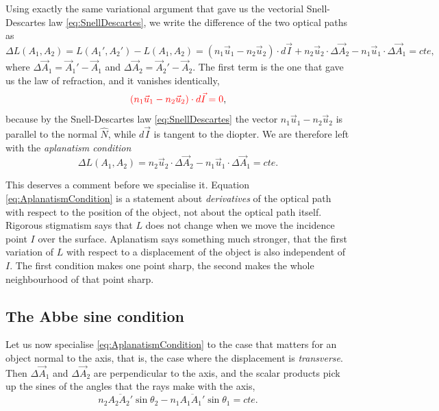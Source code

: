                 Using exactly the same variational argument that gave us the vectorial Snell-Descartes law \ref{eq:SnellDescartes}, we write the difference of the two optical paths as
                \begin{equation}\label{eq:AplanatismVariation}
                    \Delta L\left(A_1,A_2\right) = L\left(A_1',A_2'\right) - L\left(A_1,A_2\right) = \left( n_1\vec{u}_1 - n_2\vec{u}_2 \right)\cdot d\vec{I} + n_2\vec{u}_2\cdot\Delta\vec{A}_2 - n_1\vec{u}_1\cdot\Delta\vec{A}_1 = cte,
                \end{equation}
                where $\Delta\vec{A}_1 = \vec{A}_1'-\vec{A}_1$ and $\Delta\vec{A}_2 = \vec{A}_2'-\vec{A}_2$. The first term is the one that gave us the law of refraction, and it vanishes identically,
                \begin{equation*}
                    {\color{red}\left( n_1\vec{u}_1 - n_2\vec{u}_2 \right)\cdot d\vec{I} = 0},
                \end{equation*}
                because by the Snell-Descartes law \ref{eq:SnellDescartes} the vector $n_1\vec{u}_1-n_2\vec{u}_2$ is parallel to the normal $\hat{N}$, while $d\vec{I}$ is tangent to the diopter. We are therefore left with the \emph{aplanatism condition}
                \begin{equation}\label{eq:AplanatismCondition}
                    \Delta L\left( A_1,A_2 \right) = n_2\vec{u}_2\cdot\Delta\vec{A}_2 - n_1\vec{u}_1\cdot\Delta\vec{A}_1 = cte.
                \end{equation}

                This deserves a comment before we specialise it. Equation \ref{eq:AplanatismCondition} is a statement about \textit{derivatives} of the optical path with respect to the position of the object, not about the optical path itself. Rigorous stigmatism says that $L$ does not change when we move the incidence point $I$ over the surface. Aplanatism says something much stronger, that the first variation of $L$ with respect to a displacement of the object is also independent of $I$. The first condition makes one point sharp, the second makes the whole neighbourhood of that point sharp.

            \subsection{The Abbe sine condition}\label{subsec:AbbeSine}

                Let us now specialise \ref{eq:AplanatismCondition} to the case that matters for an object normal to the axis, that is, the case where the displacement is \textit{transverse}. Then $\Delta\vec{A}_1$ and $\Delta\vec{A}_2$ are perpendicular to the axis, and the scalar products pick up the sines of the angles that the rays make with the axis,
                \begin{equation}\label{eq:AbbeTransverse}
                    n_2\overline{A_2A_2'}\sin\theta_2 - n_1\overline{A_1A_1'}\sin\theta_1 = cte.
                \end{equation}

